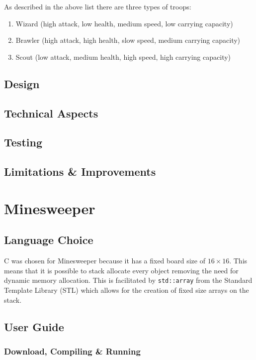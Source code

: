 \documentclass[12pt]{article}
\def\cpp{{C\nolinebreak[4]\hspace{-.05em}\raisebox{.4ex}{\tiny\bf ++}}}
\begin{document}
As described in the above list there are three types of troops:

\begin{enumerate}
    \item Wizard (high attack, low health, medium speed, low
        carrying capacity)
    \item Brawler (high attack, high health, slow speed, medium
        carrying capacity)
    \item Scout (low attack, medium health, high speed, high
        carrying capacity)
\end{enumerate}

\subsection{Design}
\subsection{Technical Aspects}
\subsection{Testing}
\subsection{Limitations \& Improvements}

\section{Minesweeper}

\subsection{Language Choice}

\cpp{} was chosen for Minesweeper because it has a fixed board
size of $16 \times 16$. This means that it is possible to stack
allocate every object removing the need for dynamic memory
allocation. This is facilitated by \texttt{std::array} from the
Standard Template Library (STL) which allows for the creation of
fixed size arrays on the stack.

\subsection{User Guide}

\subsubsection{Download, Compiling \& Running}
\end{document}
